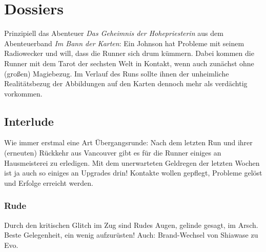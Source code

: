 \chapter{Dossiers} \label{dossiers}

Prinzipiell das Abenteuer \textit{Das Geheimnis der Hohepriesterin} aus dem Abenteuerband \textit{Im Bann der Karten}: Ein Johnson hat Probleme mit seinem Radiowecker und will, dass die Runner sich drum kümmern. Dabei kommen die Runner mit dem Tarot der sechsten Welt in Kontakt, wenn auch zunächst ohne (großen) Magiebezug. Im Verlauf des Runs sollte ihnen der unheimliche Realitätsbezug der Abbildungen auf den Karten dennoch mehr als verdächtig vorkommen.

\section{Interlude}

Wie immer erstmal eine Art Übergangsrunde: Nach dem letzten Run und ihrer (erneuten) Rückkehr aus Vancouver gibt es für die Runner einiges an Hausmeisterei zu erledigen. Mit dem unerwarteten Geldregen der letzten Wochen ist ja auch so einiges an Upgrades drin! Kontakte wollen gepflegt, Probleme gelöst und Erfolge erreicht werden.

\subsection{Rude}

Durch den kritischen Glitch im Zug sind Rudes Augen, gelinde gesagt, im Arsch. Beste Gelegenheit, ein wenig aufzurüsten! Auch: Brand-Wechsel von Shiawase zu Evo.


